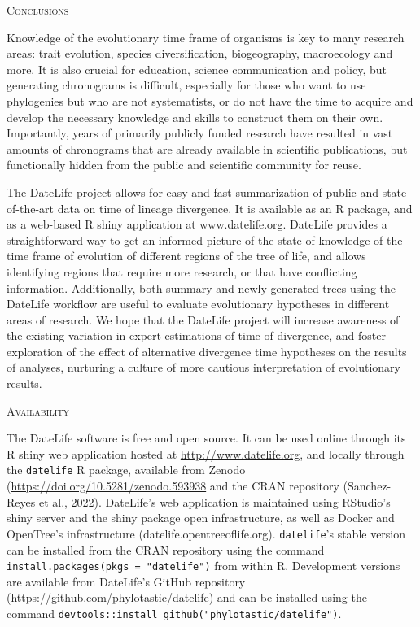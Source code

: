 \documentclass[english,man]{apa6}
\begin{document}
\begin{center}
\textsc{Conclusions}
\end{center}

Knowledge of the evolutionary time frame of organisms is key to many research areas: trait evolution, species diversification, biogeography, macroecology and more. It is also crucial for education, science communication and policy, but generating chronograms is difficult, especially for those who want to use phylogenies but who are not systematists, or do not have the time to acquire and develop the necessary knowledge and skills to construct them on their own. Importantly, years of primarily publicly funded research have resulted in vast amounts of chronograms that are already available in scientific publications, but functionally hidden from the public and scientific community for reuse.

The DateLife project allows for easy and fast summarization of public and state-of-the-art data on time of lineage divergence.
It is available as an R package, and as a web-based R shiny application at www.datelife.org.
DateLife provides a straightforward way to get an informed picture of the state of knowledge of the time frame of evolution of different regions of the tree of life, and allows identifying regions that require more research, or that have conflicting information.
Additionally, both summary and newly generated trees using the DateLife workflow are useful to evaluate evolutionary hypotheses in different areas of research. We hope that the DateLife project will increase awareness of the existing variation in expert estimations of time of divergence, and foster exploration of the effect of alternative divergence time hypotheses on the results of analyses, nurturing a culture of more cautious interpretation of evolutionary results.

\begin{center}
\textsc{Availability}
\end{center}

The DateLife software is free and open source. It can be used online through its R shiny web application hosted at \url{http://www.datelife.org}, and locally through the \texttt{datelife} R package, available from Zenodo (\url{https://doi.org/10.5281/zenodo.593938} and the CRAN repository (Sanchez-Reyes et al., 2022).
DateLife's web application is maintained using RStudio's shiny server and the shiny package open infrastructure, as well as Docker and OpenTree's infrastructure (datelife.opentreeoflife.org).
\texttt{datelife}'s stable version can be installed from the CRAN repository using the command \texttt{install.packages(pkgs\ =\ "datelife")} from within R.
Development versions are available from DateLife's GitHub repository (\url{https://github.com/phylotastic/datelife}) and can be installed using the command \texttt{devtools::install\_github("phylotastic/datelife")}.
\end{document}

